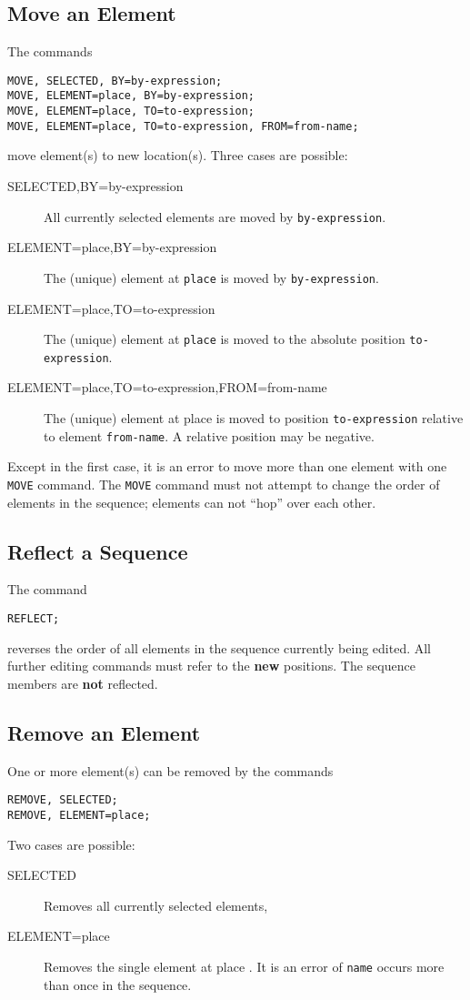 \subsection{Move an Element}
\label{sec:editmove}
The commands
\begin{verbatim}
MOVE, SELECTED, BY=by-expression;
MOVE, ELEMENT=place, BY=by-expression;
MOVE, ELEMENT=place, TO=to-expression;
MOVE, ELEMENT=place, TO=to-expression, FROM=from-name;
\end{verbatim}
move element(s) to new location(s).
Three cases are possible:
\begin{description}
\item[SELECTED,BY=by-expression]
  All currently selected elements are moved by \texttt{by-expression}.
\item[ELEMENT=place,BY=by-expression]
  The (unique) element at \texttt{place} is moved by \texttt{by-expression}.
\item[ELEMENT=place,TO=to-expression]
  The (unique) element at \texttt{place} is moved to the absolute position
  \texttt{to-expression}.
\item[ELEMENT=place,TO=to-expression,FROM=from-name]
  The (unique) element at {place}  is moved to
  position \texttt{to-expression} relative to element
  \texttt{from-name}.  A relative position may be negative.
\end{description}
Except in the first case, it is an error to move more than one element
with one \texttt{MOVE} command.
The \texttt{MOVE} command must not attempt to change the order of
elements in the sequence;
elements can not ``hop'' over each other.

\subsection{Reflect a Sequence}
\label{sec:editreflect}
The command
\begin{verbatim}
REFLECT;
\end{verbatim}
reverses the order of all elements in the sequence currently being
edited.
All further editing commands must refer to the \textbf{new} positions.
The sequence members are \textbf{not} reflected.

\subsection{Remove an Element}
\label{sec:editremove}
One or more element(s) can be removed by the commands
\begin{verbatim}
REMOVE, SELECTED;
REMOVE, ELEMENT=place;
\end{verbatim}
Two cases are possible:
\begin{description}
\item[SELECTED]
  Removes all currently selected elements,
\item[ELEMENT=place]
  Removes the single element at {place} .
  It is an error of \texttt{name} occurs more than once in the sequence.
\end{description}


